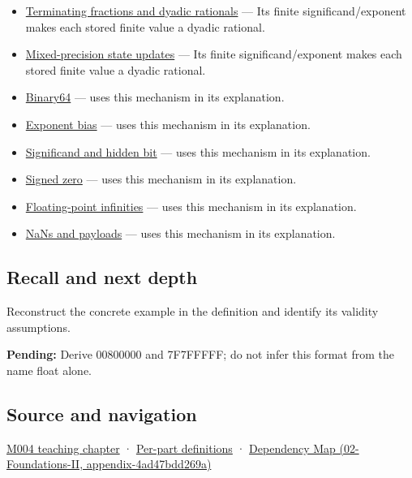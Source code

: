 \begin{itemize}
\item
  \hyperref[appendix-2a2f1b74bdd3]{Terminating fractions and dyadic rationals} --- Its finite significand/exponent makes each stored finite value a dyadic rational.
\item
  \hyperref[appendix-260182e617b7]{Mixed-precision state updates} --- Its finite significand/exponent makes each stored finite value a dyadic rational.
\item
  \hyperref[appendix-5078dfab64e6]{Binary64} --- uses this mechanism in its explanation.
\item
  \hyperref[appendix-2fae058c82e1]{Exponent bias} --- uses this mechanism in its explanation.
\item
  \hyperref[appendix-a24fd710cf67]{Significand and hidden bit} --- uses this mechanism in its explanation.
\item
  \hyperref[appendix-3a048f032c1f]{Signed zero} --- uses this mechanism in its explanation.
\item
  \hyperref[appendix-eb336149c00a]{Floating-point infinities} --- uses this mechanism in its explanation.
\item
  \hyperref[appendix-d6607cc4c235]{NaNs and payloads} --- uses this mechanism in its explanation.
\end{itemize}

\subsection{Recall and next depth}\label{recall-and-next-depth}

Reconstruct the concrete example in the definition and identify its validity assumptions.

\textbf{Pending:} Derive 00800000 and 7F7FFFFF; do not infer this format from the name float alone.

\subsection{Source and navigation}\label{source-and-navigation}

\href{Continuous\%20Notes/Computing\%20Foundations\%20-\%20From\%20Bits\%20to\%20C++\%20and\%20Systems\%20APIs\#A\%20stretching\%20ruler\%20for\%20real-valued\%20quantities}{M004 teaching chapter} · \hyperref[appendix-fd090d982a15]{Per-part definitions} · \href{}{Dependency Map (02-Foundations-II, appendix-4ad47bdd269a)}
